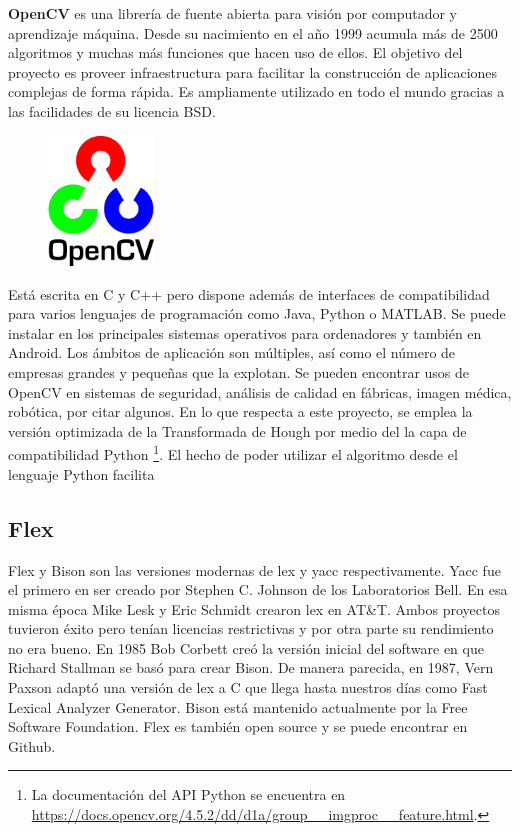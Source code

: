 \textbf{OpenCV} \cite{opencvTeam_oficialSite_main} es una librería de fuente abierta para visión por computador y aprendizaje máquina. Desde su nacimiento en el año 1999 acumula más de 2500 algoritmos y muchas más funciones que hacen uso de ellos. El objetivo del proyecto es proveer infraestructura para facilitar la construcción de aplicaciones complejas de forma rápida. Es ampliamente utilizado en todo el mundo gracias a las facilidades de su licencia BSD. 

\begin{figure}
    \centering
    \includegraphics[width=0.25\textwidth]{imaxes/e-fundamentos-tecnologicos/logo-opencv.png}
\end{figure}

Está escrita en C y C++ pero dispone además de interfaces de compatibilidad para varios lenguajes de programación como Java, Python o MATLAB. Se puede instalar en los principales sistemas operativos para ordenadores y también en Android. Los ámbitos de aplicación son múltiples, así como el número de empresas grandes y pequeñas que la explotan. Se pueden encontrar usos de OpenCV en sistemas de seguridad, análisis de calidad en fábricas, imagen médica, robótica, por citar algunos. En lo que respecta a este proyecto, se emplea la versión optimizada de la Transformada de Hough por medio del la capa de compatibilidad Python \footnote{La documentación del API Python se encuentra en \url{https://docs.opencv.org/4.5.2/dd/d1a/group__imgproc__feature.html}.}. El hecho de poder utilizar el algoritmo desde el lenguaje Python facilita 

\subsection{Flex}

Flex y Bison son las versiones modernas de lex y yacc respectivamente. Yacc fue el primero en ser creado por Stephen C. Johnson de los Laboratorios Bell. En esa misma época Mike Lesk y Eric Schmidt crearon lex en AT\&T. Ambos proyectos tuvieron éxito pero tenían licencias restrictivas y por otra parte su rendimiento no era bueno.
En 1985 Bob Corbett creó la versión inicial del software en que Richard Stallman se basó para crear Bison. De manera parecida, en 1987, Vern Paxson adaptó una versión de lex a C que llega hasta nuestros días como Fast Lexical Analyzer Generator. Bison está mantenido actualmente por la Free Software Foundation. Flex es también open source y se puede encontrar en Github.


